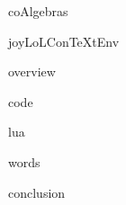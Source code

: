 
\usemodule[t-diSimp]

\startDiSimpComponent coAlgebras

\diSimpEnvironment joyLoLConTeXtEnv

\startJoyLoLCoAlg[title=CoAlgebras][coAlgebras]

\diSimpComponent overview

\diSimpComponent code

\diSimpComponent lua

\diSimpComponent words

\diSimpComponent conclusion

\stopJoyLoLCoAlg

\stopDiSimpComponent
